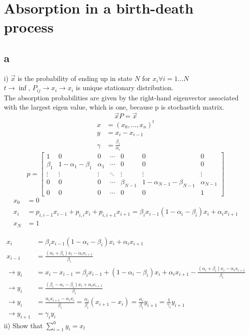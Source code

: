 \section{Absorption in a birth-death process}
\subsection{a}
i) $\vec{x}$ is the probability of ending up in state $N$ for $x_i \forall i=1 \dots N$\\
$t\rightarrow\inf$, $P_{ij} \rightarrow x_i \rightarrow x_i $ is unique stationary distribution. \\
The absorption probabilities are given by the right-hand eigenvector associated with the largest eigen value, which is one, because p is stochastich matrix.
\[ \vec{x}P = \vec{x} \]
\begin{align*}
x &= (x_0,\dots, x_n)^t\\
y &= x_i - x_{i-1}\\
\gamma &= \frac{\beta_{i}}{\alpha _{i}}
\end{align*}
\[p = \begin{bmatrix}
1 & 0 & 0 & \cdots & 0 & 0 & 0 \\
\beta _1 & 1-\alpha _1-\beta_1 & \alpha _1 & \cdots & 0 & 0 & 0 \\
\vdots &\vdots&\vdots&\ddots&\vdots&\vdots&\vdots\\
0 & 0 & 0 & \cdots & \beta_{N-1} & 1-\alpha_{N-1}-\beta_{N-1}&\alpha_{N-1}\\
0 & 0 & 0 & \cdots & 0 & 0 & 1 
\end{bmatrix}\]
\begin{align*}
x_0 &= 0\\
x_i &= p_{i,i-1}x_{i-1}+p_{i,i}x_i + p_{i,i+1}x_{i+1} = \beta_i x_{i-1}(1-\alpha_i - \beta_i)x_i + \alpha_i x_{i+1}\\
x_N &= 1
\end{align*}

\begin{align*}
x_i &= \beta_i x_{i-1}(1-\alpha_i - \beta_i)x_i + \alpha_i x_{i+1}\\
x_{i-1} &= \frac{(\alpha_i+\beta_i)x_i-\alpha_ix_{i+1}}{\beta_i}\\
\rightarrow y_i &= x_i - x_{i-1} = \beta_i x_{i-1} + (1-\alpha_i -\beta_i)x_i + \alpha_ix_{i+1}- \frac{(\alpha_i+\beta_i)x_i-\alpha_ix_{i+1}}{\beta_i}\\
\rightarrow y_i &= \frac{(\beta_i-\alpha_i -\beta_i)x_i+\alpha_ix_{i+1}}{\beta_i}\\
\rightarrow y_i &= \frac{\alpha_ix_{i+1} - \alpha_ix_{i}}{\beta_i} = \frac{\alpha_i}{\beta_i}(x_{i+1}-x_i) = \frac{\alpha_i}{\beta_i}y_{i+1} = \frac{1}{\gamma_i}y_{i+1}\\
\rightarrow y_{i+1} &= \gamma_iy_i
\end{align*}
ii) Show that $\sum\limits_{i=1}^{0}y_i = x_l$

